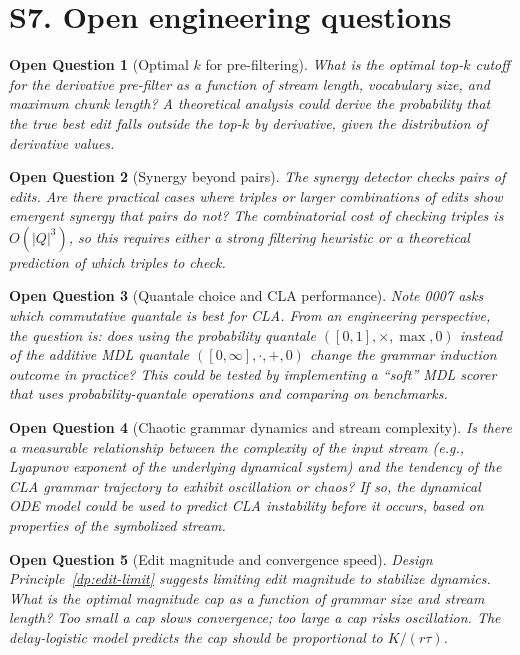 \documentclass[11pt]{article}
\newtheorem{openquestion}{Open Question}
\begin{document}
\section{S7. Open engineering questions}

\begin{openquestion}[Optimal $k$ for pre-filtering]
What is the optimal top-$k$ cutoff for the derivative pre-filter as a function of stream length, vocabulary size, and maximum chunk length?  A theoretical analysis could derive the probability that the true best edit falls outside the top-$k$ by derivative, given the distribution of derivative values.
\end{openquestion}

\begin{openquestion}[Synergy beyond pairs]
The synergy detector checks pairs of edits.  Are there practical cases where triples or larger combinations of edits show emergent synergy that pairs do not?  The combinatorial cost of checking triples is $O(|Q|^3)$, so this requires either a strong filtering heuristic or a theoretical prediction of which triples to check.
\end{openquestion}

\begin{openquestion}[Quantale choice and CLA performance]
Note 0007 asks which commutative quantale is best for CLA.  From an engineering perspective, the question is: does using the probability quantale $([0,1], \times, \max, 0)$ instead of the additive MDL quantale $([0,\infty], \cdot, +, 0)$ change the grammar induction outcome in practice?  This could be tested by implementing a ``soft'' MDL scorer that uses probability-quantale operations and comparing on benchmarks.
\end{openquestion}

\begin{openquestion}[Chaotic grammar dynamics and stream complexity]
Is there a measurable relationship between the complexity of the input stream (e.g., Lyapunov exponent of the underlying dynamical system) and the tendency of the CLA grammar trajectory to exhibit oscillation or chaos?  If so, the dynamical ODE model could be used to \emph{predict} CLA instability before it occurs, based on properties of the symbolized stream.
\end{openquestion}

\begin{openquestion}[Edit magnitude and convergence speed]
Design Principle~\ref{dp:edit-limit} suggests limiting edit magnitude to stabilize dynamics.  What is the optimal magnitude cap as a function of grammar size and stream length?  Too small a cap slows convergence; too large a cap risks oscillation.  The delay-logistic model predicts the cap should be proportional to $K / (r \tau)$.
\end{openquestion}
\end{document}
